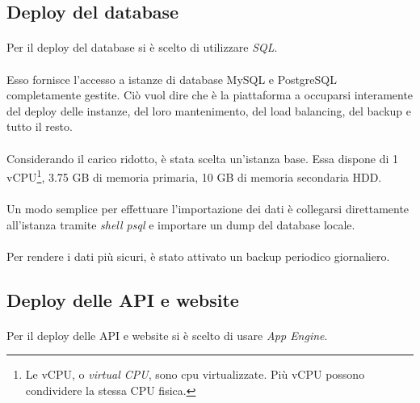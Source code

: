 \documentclass[11pt,a4paper,english]{article}
\begin{document}
\subsection{Deploy del database}

\paragraph{} Per il deploy del database si è scelto di utilizzare \emph{SQL}. 

\paragraph{} Esso fornisce l'accesso a istanze di database MySQL e PostgreSQL completamente gestite. Ciò vuol dire che è la piattaforma a occuparsi interamente del deploy delle instanze, del loro mantenimento, del load balancing, del backup e tutto il resto. 

\paragraph{} Considerando il carico ridotto, è stata scelta un'istanza base. Essa dispone di 1 vCPU\footnote{Le vCPU, o \emph{virtual CPU}, sono cpu virtualizzate. Più vCPU possono condividere la stessa CPU fisica.}, 3.75 GB di memoria primaria, 10 GB di memoria secondaria HDD.

\paragraph{} Un modo semplice per effettuare l'importazione dei dati è collegarsi direttamente all'istanza tramite \emph{shell psql} e importare un dump del database locale. 
\paragraph{} Per rendere i dati più sicuri, è stato attivato un backup periodico giornaliero.

\subsection{Deploy delle API e website}

\paragraph{} Per il deploy delle API e website si è scelto di usare \emph{App Engine}.
\end{document}
